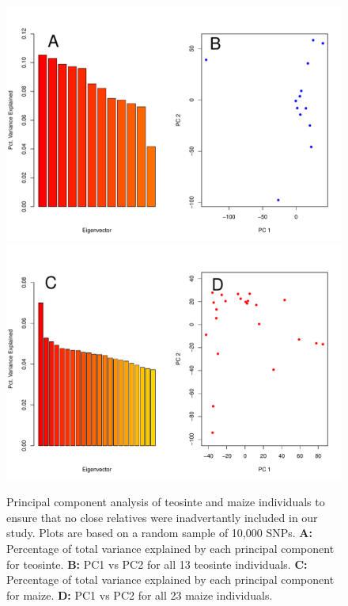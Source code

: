 \begin{figure}
  \begin{center}
  \includegraphics[width=.75\textwidth]{FigsAndFiles/tilPCA_aug.pdf}\\
  \includegraphics[width=.75\textwidth]{FigsAndFiles/bknPCA_aug.pdf}\\
  \end{center}
  \caption{Principal component analysis of teosinte and maize individuals to ensure that no close relatives were inadvertantly included in our study. Plots are based on a random sample of 10,000 SNPs. {\bf A:} Percentage of total variance explained by each principal component for teosinte. {\bf B:} PC1 vs PC2 for all 13 teosinte individuals. {\bf C:} Percentage of total variance explained by each principal component for maize. {\bf D:} PC1 vs PC2 for all 23 maize individuals. \label{sFig:PCA}}
\end{figure}
\clearpage


